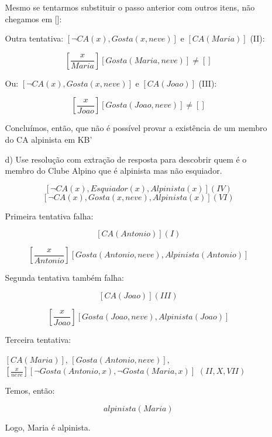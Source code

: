 \documentclass{article}
\begin{document}
\begin{enumerate}
\begin{itemize}
        Mesmo se tentarmos substituir o passo anterior com outros itens, 
        não chegamos em []:

        Outra tentativa: $[\neg CA(x), Gosta(x, neve)]$ e $[CA (Maria)]$ (II):

        $$\left[\frac{x}{Maria}\right][Gosta(Maria, neve)] \neq []$$

        Ou: $[\neg CA(x), Gosta(x, neve)]$ e $[CA (Joao)]$ (III):

        $$\left[\frac{x}{Joao}\right][Gosta(Joao, neve)] \neq []$$

        Concluímos, então, que não é possível provar a existência de um
        membro do CA alpinista em KB'

        \item [d)] Use resolução com extração de resposta para descobrir quem é o membro do Clube
        Alpino que é alpinista mas não esquiador.

        $$[\neg CA(x), Esquiador(x), Alpinista(x)] (IV)$$
        $$[\neg CA(x), Gosta(x, neve), Alpinista(x)] (VI)$$

        Primeira tentativa falha:

        $$[CA (Antonio)] (I)$$

        $$\left[\frac{x}{Antonio}\right][Gosta(Antonio, neve), Alpinista(Antonio)]$$

        Segunda tentativa também falha:

        $$[CA (Joao)] (III)$$

        $$\left[\frac{x}{Joao}\right][Gosta(Joao, neve), Alpinista(Joao)]$$

        Terceira tentativa:

        $[CA (Maria)]$, $[Gosta(Antonio, neve)]$, $\left[\frac{x}{neve}\right][\neg Gosta (Antonio,x), \neg Gosta (Maria,x)]$  $(II, X, VII)$

        Temos, então:

        $$alpinista(Maria)$$

        Logo, Maria é alpinista.

    \end{itemize}


\end{enumerate}
\end{document}
